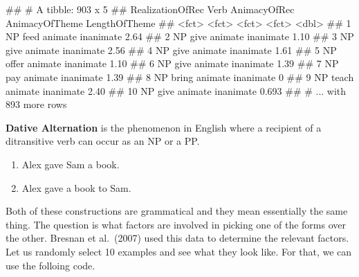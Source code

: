 \documentclass[
]{book}
\newenvironment{Shaded}{\begin{snugshade}}{\end{snugshade}}
\newcommand{\NormalTok}[1]{#1}
\providecommand{\tightlist}{%
  \setlength{\itemsep}{0pt}\setlength{\parskip}{0pt}}
\begin{document}
\begin{Shaded}
\begin{Highlighting}[]
\NormalTok{\#\# \# A tibble: 903 x 5}
\NormalTok{\#\#    RealizationOfRec Verb  AnimacyOfRec AnimacyOfTheme LengthOfTheme}
\NormalTok{\#\#    \textless{}fct\textgreater{}            \textless{}fct\textgreater{} \textless{}fct\textgreater{}        \textless{}fct\textgreater{}                  \textless{}dbl\textgreater{}}
\NormalTok{\#\#  1 NP               feed  animate      inanimate              2.64 }
\NormalTok{\#\#  2 NP               give  animate      inanimate              1.10 }
\NormalTok{\#\#  3 NP               give  animate      inanimate              2.56 }
\NormalTok{\#\#  4 NP               give  animate      inanimate              1.61 }
\NormalTok{\#\#  5 NP               offer animate      inanimate              1.10 }
\NormalTok{\#\#  6 NP               give  animate      inanimate              1.39 }
\NormalTok{\#\#  7 NP               pay   animate      inanimate              1.39 }
\NormalTok{\#\#  8 NP               bring animate      inanimate              0    }
\NormalTok{\#\#  9 NP               teach animate      inanimate              2.40 }
\NormalTok{\#\# 10 NP               give  animate      inanimate              0.693}
\NormalTok{\#\# \# ... with 893 more rows}
\end{Highlighting}
\end{Shaded}

\textbf{Dative Alternation} is the phenomenon in English where a recipient of a ditransitive verb can occur as an NP or a PP.

\begin{enumerate}
\def\labelenumi{\arabic{enumi}.}
\tightlist
\item
  Alex gave Sam a book.
\item
  Alex gave a book to Sam.
\end{enumerate}

Both of these constructions are grammatical and they mean essentially the same thing. The question is what factors are involved in picking one of the forms over the other. Bresnan et al.~(2007) used this data to determine the relevant factors.
Let us randomly select 10 examples and see what they look like. For that, we can use the folloing code.
\end{document}
